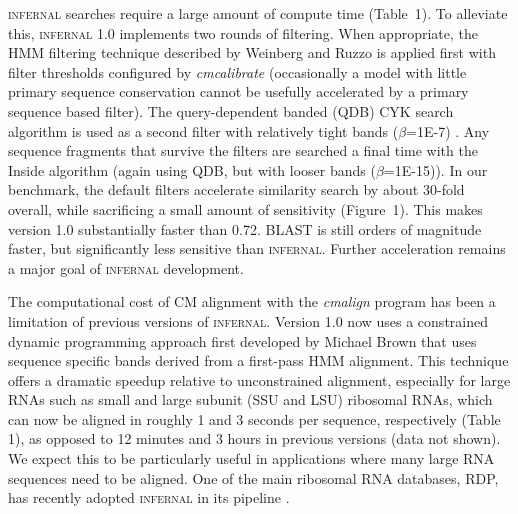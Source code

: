 \textsc{infernal} searches require a large amount of compute time
(Table~1). To alleviate this, \textsc{infernal} 1.0 implements two
rounds of filtering.  When appropriate, the HMM filtering technique
described by Weinberg and Ruzzo \citep{WeinbergRuzzo06} is applied
first with filter thresholds configured by \emph{cmcalibrate}
(occasionally a model with little primary sequence conservation cannot
be usefully accelerated by a primary sequence based filter).  The
query-dependent banded (QDB) CYK search algorithm is used as a second
filter with relatively tight bands ($\beta$=1E-7)
\citep{NawrockiEddy07}.  Any sequence fragments that survive the filters are
searched a final time with the Inside algorithm (again using QDB, but with looser
bands ($\beta$=1E-15)).
In our benchmark, the default filters accelerate similarity search by
about 30-fold overall, while sacrificing a small amount of sensitivity
(Figure~1). This makes version 1.0 substantially faster than
0.72. \textsc{BLAST} is still orders of magnitude faster, but
significantly less sensitive than \textsc{infernal}. Further
acceleration remains a major goal of \textsc{infernal} development.

The computational cost of CM alignment with the \emph{cmalign} program
has been a limitation of previous versions of
\textsc{infernal}. Version 1.0 now uses a constrained dynamic
programming approach first developed by Michael Brown \citep{Brown00}
that uses sequence specific bands derived from a first-pass HMM
alignment. This technique offers a dramatic speedup relative to
unconstrained alignment, especially for large RNAs such as small and
large subunit (SSU and LSU) ribosomal RNAs, which can now be aligned
in roughly 1 and 3 seconds per sequence, respectively (Table 1), as
opposed to 12 minutes and 3 hours in previous versions (data not
shown). We expect this to be particularly useful in applications where
many large RNA sequences need to be aligned. One of the main ribosomal
RNA databases, RDP, has recently adopted \textsc{infernal} in its
pipeline \citep{Cole09}.

